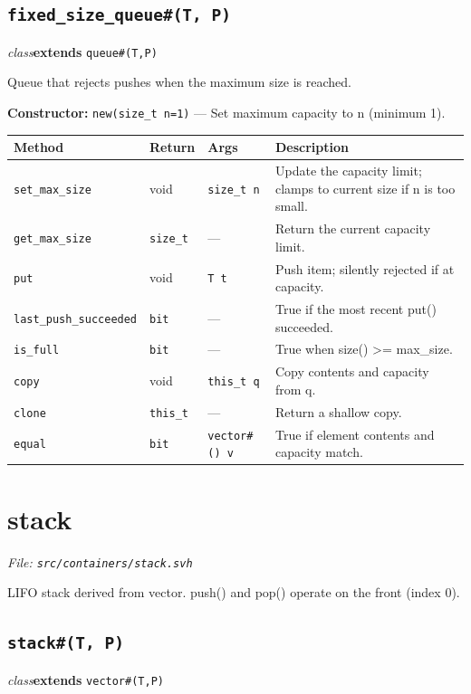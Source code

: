 \documentclass[11pt,letterpaper]{report}
\begin{document}
\subsection*{\texttt{fixed\_size\_queue\#(T, P)}}
\noindent\small\textit{class}\quad \textbf{extends} \texttt{queue\#(T,P)}\par

Queue that rejects pushes when the maximum size is reached.

\noindent\textbf{Constructor:} \texttt{new(size\_t n=1)} --- Set maximum capacity to n (minimum 1).

\begin{xltabular}{\linewidth}{>{\small}p{1.35in} >{\small}p{1.25in} >{\small}p{0.95in} >{\small}X}
\toprule
\textbf{Method} & \textbf{Return} & \textbf{Args} & \textbf{Description} \\
\midrule
\endhead
\bottomrule
\endfoot
\texttt{set\_max\_size} & void & \texttt{size\_t n} & Update the capacity limit; clamps to current size if n is too small. \\
\texttt{get\_max\_size} & \texttt{size\_t} & --- & Return the current capacity limit. \\
\texttt{put} & void & \texttt{T t} & Push item; silently rejected if at capacity. \\
\texttt{last\_push\_succeeded} & \texttt{bit} & --- & True if the most recent put() succeeded. \\
\texttt{is\_full} & \texttt{bit} & --- & True when size() \textgreater{}= max\_size. \\
\texttt{copy} & void & \texttt{this\_t q} & Copy contents and capacity from q. \\
\texttt{clone} & \texttt{this\_t} & --- & Return a shallow copy. \\
\texttt{equal} & \texttt{bit} & \texttt{vector\#() v} & True if element contents and capacity match. \\
\end{xltabular}

\section{stack}
\noindent\small\textit{File: \texttt{src/containers/stack.svh}}\par

LIFO stack derived from vector. push() and pop() operate on the front (index 0).

\subsection*{\texttt{stack\#(T, P)}}
\noindent\small\textit{class}\quad \textbf{extends} \texttt{vector\#(T,P)}\par
\end{document}
